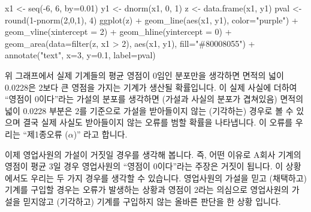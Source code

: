 \documentclass[
]{book}
\newenvironment{Shaded}{\begin{snugshade}}{\end{snugshade}}
\newcommand{\AttributeTok}[1]{\textcolor[rgb]{0.77,0.63,0.00}{#1}}
\newcommand{\DecValTok}[1]{\textcolor[rgb]{0.00,0.00,0.81}{#1}}
\newcommand{\FloatTok}[1]{\textcolor[rgb]{0.00,0.00,0.81}{#1}}
\newcommand{\FunctionTok}[1]{\textcolor[rgb]{0.00,0.00,0.00}{#1}}
\newcommand{\NormalTok}[1]{#1}
\newcommand{\OtherTok}[1]{\textcolor[rgb]{0.56,0.35,0.01}{#1}}
\newcommand{\SpecialCharTok}[1]{\textcolor[rgb]{0.00,0.00,0.00}{#1}}
\newcommand{\StringTok}[1]{\textcolor[rgb]{0.31,0.60,0.02}{#1}}
\begin{document}
\begin{Shaded}
\begin{Highlighting}[]

\NormalTok{x1 }\OtherTok{\textless{}{-}} \FunctionTok{seq}\NormalTok{(}\SpecialCharTok{{-}}\DecValTok{6}\NormalTok{, }\DecValTok{6}\NormalTok{, }\AttributeTok{by=}\FloatTok{0.01}\NormalTok{)}
\NormalTok{y1 }\OtherTok{\textless{}{-}} \FunctionTok{dnorm}\NormalTok{(x1, }\DecValTok{0}\NormalTok{, }\DecValTok{1}\NormalTok{)}
\NormalTok{z }\OtherTok{\textless{}{-}} \FunctionTok{data.frame}\NormalTok{(x1, y1)}
\NormalTok{pval }\OtherTok{\textless{}{-}} \FunctionTok{round}\NormalTok{(}\DecValTok{1}\SpecialCharTok{{-}}\FunctionTok{pnorm}\NormalTok{(}\DecValTok{2}\NormalTok{,}\DecValTok{0}\NormalTok{,}\DecValTok{1}\NormalTok{), }\DecValTok{4}\NormalTok{)}
\FunctionTok{ggplot}\NormalTok{(z) }\SpecialCharTok{+}
  \FunctionTok{geom\_line}\NormalTok{(}\FunctionTok{aes}\NormalTok{(x1, y1), }\AttributeTok{color=}\StringTok{"purple"}\NormalTok{) }\SpecialCharTok{+}
  \FunctionTok{geom\_vline}\NormalTok{(}\AttributeTok{xintercept =} \DecValTok{2}\NormalTok{) }\SpecialCharTok{+}
  \FunctionTok{geom\_hline}\NormalTok{(}\AttributeTok{yintercept =} \DecValTok{0}\NormalTok{) }\SpecialCharTok{+}
  \FunctionTok{geom\_area}\NormalTok{(}\AttributeTok{data=}\FunctionTok{filter}\NormalTok{(z, x1 }\SpecialCharTok{\textgreater{}} \DecValTok{2}\NormalTok{), }
            \FunctionTok{aes}\NormalTok{(x1, y1), }
            \AttributeTok{fill=}\StringTok{"\#80008055"}\NormalTok{) }\SpecialCharTok{+}
  \FunctionTok{annotate}\NormalTok{(}\StringTok{"text"}\NormalTok{, }\AttributeTok{x=}\DecValTok{3}\NormalTok{, }\AttributeTok{y=}\FloatTok{0.1}\NormalTok{, }\AttributeTok{label=}\NormalTok{pval) }
\end{Highlighting}
\end{Shaded}

위 그래프에서 실제 기계들의 평균 영점이 0임인 분포만을 생각하면 면적의 넓이 0.0228은 2보다 큰 영점을 가지는 기계가 생산될 확률입니다. 이 실제 사실에 더하여 ``영점이 0이다''라는 가설의 분포를 생각하면 (가설과 사실의 분포가 겹쳐있음) 면적의 넓이 0.0228 부분은 2를 기준으로 가설을 받아들이지 않는 (기각하는) 경우로 볼 수 있으며 결국 실제 사실도 받아들이지 않는 오류를 범할 확률을 나타냅니다. 이 오류를 우리는 ``제1종오류 (\(\alpha\))'' 라고 합니다.

이제 영업사원의 가설이 거짓일 경우를 생각해 봅니다. 즉, 어떤 이유로 A회사 기계의 영점이 평균 3일 경우 영업사원의 ``영점이 0이다''라는 주장은 거짓이 됩니다. 이 상황에서도 우리는 두 가지 경우를 생각할 수 있습니다. 영업사원의 가설을 믿고 (채택하고) 기계를 구입할 경우는 오류가 발생하는 상황과 영점이 2라는 의심으로 영업사원의 가설을 믿지않고 (기각하고) 기계를 구입하지 않는 올바른 판단을 한 상황 입니다.
\end{document}

